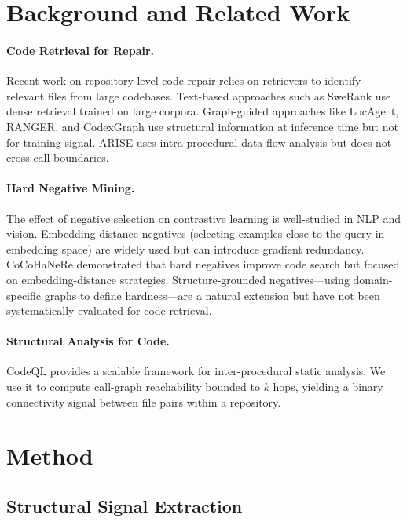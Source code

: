 \documentclass[11pt]{article}
\begin{document}
\section{Background and Related Work}
\label{sec:related}

\paragraph{Code Retrieval for Repair.}
Recent work on repository-level code repair relies on retrievers to identify relevant files from large codebases. Text-based approaches such as SweRank use dense retrieval trained on large corpora. Graph-guided approaches like LocAgent, RANGER, and CodexGraph use structural information at inference time but not for training signal. ARISE uses intra-procedural data-flow analysis but does not cross call boundaries.

\paragraph{Hard Negative Mining.}
The effect of negative selection on contrastive learning is well-studied in NLP and vision. Embedding-distance negatives (selecting examples close to the query in embedding space) are widely used but can introduce gradient redundancy. CoCoHaNeRe demonstrated that hard negatives improve code search but focused on embedding-distance strategies. Structure-grounded negatives---using domain-specific graphs to define hardness---are a natural extension but have not been systematically evaluated for code retrieval.

\paragraph{Structural Analysis for Code.}
CodeQL provides a scalable framework for inter-procedural static analysis. We use it to compute call-graph reachability bounded to $k$ hops, yielding a binary connectivity signal between file pairs within a repository.

\section{Method}
\label{sec:method}

\subsection{Structural Signal Extraction}
\label{sec:extraction}
\end{document}
